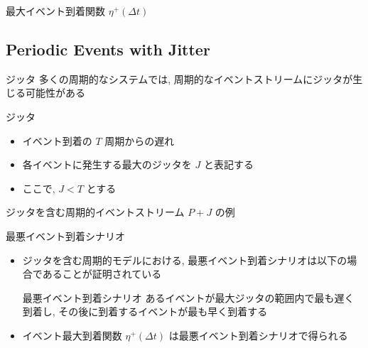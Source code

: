 \begin{frame}{最大イベント到着関数 $\eta^{+}(\Delta t)$}
\end{frame}


\subsection{Periodic Events with Jitter}
\label{ssec: periodic events with jitter}

\begin{frame}{ジッタ}
    多くの周期的なシステムでは, 周期的なイベントストリームにジッタが生じる可能性がある
    \begin{block}{ジッタ}
        \begin{itemize}
            \item イベント到着の $T$ 周期からの遅れ
            \item 各イベントに発生する最大のジッタを $J$ と表記する
            \item ここで, $J < T$ とする
        \end{itemize}
    \end{block}
\end{frame}

\begin{frame}{ジッタを含む周期的イベントストリーム $P+J$ の例}
\end{frame}

\begin{frame}{最悪イベント到着シナリオ}
    \begin{itemize}
        \item ジッタを含む周期的モデルにおける, 最悪イベント到着シナリオは以下の場合であることが証明されている
              \begin{block}{最悪イベント到着シナリオ}
                  あるイベントが最大ジッタの範囲内で最も遅く到着し, その後に到着するイベントが最も早く到着する
              \end{block}
              \vspace{5mm}
        \item イベント最大到着関数 $\eta^{+}(\Delta t)$ は最悪イベント到着シナリオで得られる
    \end{itemize}
\end{frame}

